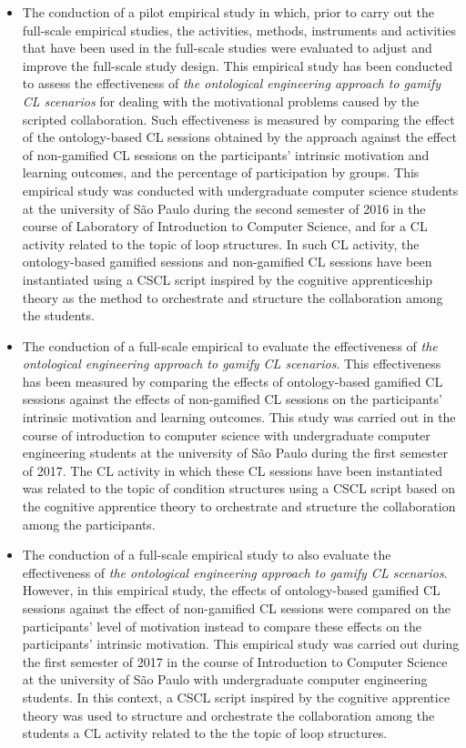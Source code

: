 \begin{description}
\begin{itemize}
\item
The conduction of a pilot empirical study in which, prior to carry out the full-scale empirical studies, the activities, methods, instruments and activities that have been used in the full-scale studies were evaluated to adjust and improve the full-scale study design. This empirical study has been conducted to assess the effectiveness of \emph{the ontological engineering approach to gamify CL scenarios} for dealing with the motivational problems caused by the scripted collaboration. Such effectiveness is measured by comparing the effect of the ontology-based CL sessions obtained by the approach against the effect of non-gamified CL sessions on the participants' intrinsic motivation and learning outcomes, and the percentage of participation by groups. This empirical study was conducted with undergraduate computer science students at the university of São Paulo during the second semester of 2016 in the course of Laboratory of Introduction to Computer Science, and for a CL activity related to the topic of loop structures. In such CL activity, the ontology-based gamified sessions and non-gamified CL sessions have been instantiated using a CSCL script inspired by the cognitive apprenticeship theory as the method to orchestrate and structure the collaboration among the students.

\item
The conduction of a full-scale empirical to evaluate the effectiveness of \emph{the ontological engineering approach to gamify CL scenarios}. This effectiveness has been measured by comparing the effects of ontology-based gamified CL sessions against the effects of non-gamified CL sessions on the participants' intrinsic motivation and learning outcomes. This study was carried out in the course of introduction to computer science with undergraduate computer engineering students at the university of São Paulo during the first semester of 2017. The CL activity in which these CL sessions have been instantiated was related to the topic of condition structures using a CSCL script based on the cognitive apprentice theory to orchestrate and structure the collaboration among the participants.

\item
The conduction of a full-scale empirical study to also evaluate the effectiveness of \emph{the ontological engineering approach to gamify CL scenarios}.
However, in this empirical study, the effects of ontology-based gamified CL sessions against the effect of non-gamified CL sessions were compared on the participants' level of motivation instead to compare these effects on the participants' intrinsic motivation. This empirical study was carried out during the first semester of 2017 in the course of Introduction to Computer Science at the university of São Paulo with undergraduate computer engineering students. In this context, a CSCL script inspired by the cognitive apprentice theory was used to structure and orchestrate the collaboration among the students a CL activity related to the the topic of loop structures.


\end{itemize}
\end{description}
